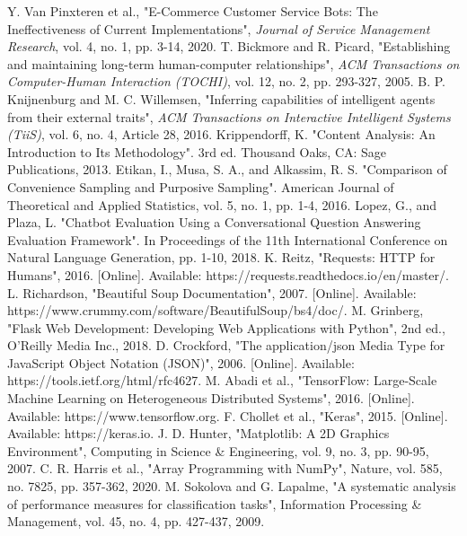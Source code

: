 \documentclass[conference]{IEEEtran}
\begin{document}
\begin{thebibliography}{00}
     Y. Van Pinxteren et al., "E-Commerce Customer Service Bots: The Ineffectiveness of Current Implementations", \textit{Journal of Service Management Research}, vol. 4, no. 1, pp. 3-14, 2020.
     T. Bickmore and R. Picard, "Establishing and maintaining long-term human-computer relationships", \textit{ACM Transactions on Computer-Human Interaction (TOCHI)}, vol. 12, no. 2, pp. 293-327, 2005.
     B. P. Knijnenburg and M. C. Willemsen, "Inferring capabilities of intelligent agents from their external traits", \textit{ACM Transactions on Interactive Intelligent Systems (TiiS)}, vol. 6, no. 4, Article 28, 2016.
     Krippendorff, K. "Content Analysis: An Introduction to Its Methodology". 3rd ed. Thousand Oaks, CA: Sage Publications, 2013.
     Etikan, I., Musa, S. A., and Alkassim, R. S. "Comparison of Convenience Sampling and Purposive Sampling". American Journal of Theoretical and Applied Statistics, vol. 5, no. 1, pp. 1-4, 2016.
     Lopez, G., and Plaza, L. "Chatbot Evaluation Using a Conversational Question Answering Evaluation Framework". In Proceedings of the 11th International Conference on Natural Language Generation, pp. 1-10, 2018.
     K. Reitz, "Requests: HTTP for Humans", 2016. [Online]. Available: https://requests.readthedocs.io/en/master/.
      L. Richardson, "Beautiful Soup Documentation", 2007. [Online]. Available: https://www.crummy.com/software/BeautifulSoup/bs4/doc/.
     M. Grinberg, "Flask Web Development: Developing Web Applications with Python", 2nd ed., O'Reilly Media Inc., 2018.
     D. Crockford, "The application/json Media Type for JavaScript Object Notation (JSON)", 2006. [Online]. Available: https://tools.ietf.org/html/rfc4627.
     M. Abadi et al., "TensorFlow: Large-Scale Machine Learning on Heterogeneous Distributed Systems", 2016. [Online]. Available: https://www.tensorflow.org.
     F. Chollet et al., "Keras", 2015. [Online]. Available: https://keras.io.
     J. D. Hunter, "Matplotlib: A 2D Graphics Environment", Computing in Science \& Engineering, vol. 9, no. 3, pp. 90-95, 2007.
     C. R. Harris et al., "Array Programming with NumPy", Nature, vol. 585, no. 7825, pp. 357-362, 2020.
     M. Sokolova and G. Lapalme, "A systematic analysis of performance measures for classification tasks", Information Processing \& Management, vol. 45, no. 4, pp. 427-437, 2009.

\end{thebibliography}
\end{document}
